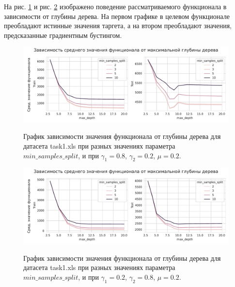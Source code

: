 \documentclass{article}
\begin{document}
На рис. \ref{ris:image4} и рис. \ref{ris:image5} изображено поведение рассматриваемого функционала в зависимости от глубины дерева. На первом графике в целевом функционале преобладают истинные значения таргета, а на втором преобладают значения, предсказанные градиентным бустингом. 


\begin{figure}[h]
	\begin{center}
		\begin{minipage}[h]{0.95\linewidth}
			{\includegraphics[width=1.0\linewidth]{../figures/max_depth_task1_gamma_08_mu_02.pdf}}	
		\end{minipage}
	\end{center}
	
	\caption{График зависимости значения функционала от глубины дерева для датасета task1.xls при разных значениях параметра $min\_samples\_split$, и при $\gamma_1 = 0.8$, $\gamma_2 = 0.2$, $\mu = 0.2$. }
	\label{ris:image4}
\end{figure}


\begin{figure}[h]
	\begin{center}
		\begin{minipage}[h]{0.95\linewidth}
			{\includegraphics[width=1.0\linewidth]{../figures/max_depth_task1_gamma_02_mu_02.pdf}}	
		\end{minipage}
	\end{center}
	
	\caption{График зависимости значения функционала от глубины дерева для датасета task1.xls при разных значениях параметра $min\_samples\_split$, и при $\gamma_1 = 0.2$, $\gamma_2 = 0.8$, $\mu = 0.2$. }
	\label{ris:image5}
\end{figure}
\end{document}
